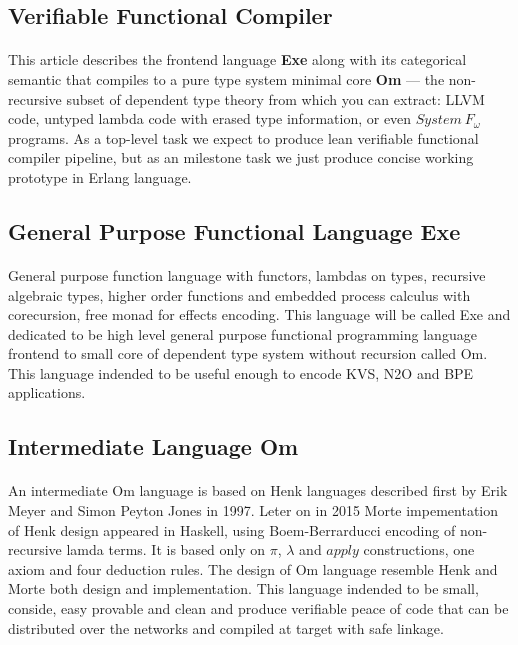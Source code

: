 \documentclass[11pt,oneside]{article}
\begin{document}
\subsection{Verifiable Functional Compiler}

   \paragraph{}
   This article describes the frontend language {\bf Exe} along with its categorical semantic
   that compiles to a pure type system minimal core {\bf Om} --- the
   non-recursive subset of dependent type theory from which you can extract: LLVM code,
   untyped lambda code with erased type information, or even $System\ F_\omega$ programs.
   As a top-level task we expect to produce lean verifiable functional compiler pipeline,
   but as an milestone task we just produce concise working prototype in Erlang language.

\subsection{General Purpose Functional Language Exe}

   \paragraph{}
   General purpose function language with functors, lambdas on types, recursive algebraic types,
   higher order functions and embedded process calculus with corecursion, free monad for effects encoding.
   This language will be called Exe and dedicated to be high level general purpose functional
   programming language frontend to small core of dependent type system without recursion called Om.
   This language indended to be useful enough to encode KVS, N2O and BPE applications.

\subsection{Intermediate Language Om}

   \paragraph{}
   An intermediate Om language is based on Henk\cite{henk} languages described first
   by Erik Meyer and Simon Peyton Jones in 1997. Leter on in 2015 Morte impementation
   of Henk design appeared in Haskell, using Boem-Berrarducci encoding of non-recursive lamda terms.
   It is based only on $\pi$, $\lambda$ and $apply$ constructions, one axiom and four deduction rules.
   The design of Om language resemble Henk and Morte both design and implementation.
   This language indended to be small, conside, easy provable and clean and produce
   verifiable peace of code that can be distributed over the networks and compiled at target with
   safe linkage.
\end{document}
